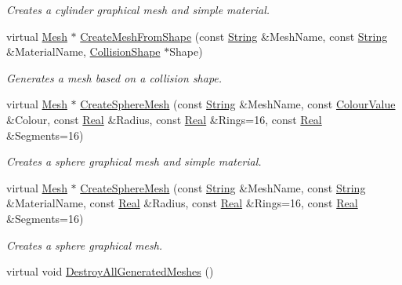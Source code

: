 \begin{DoxyCompactItemize}
\begin{DoxyCompactList}\small\item\em Creates a cylinder graphical mesh and simple material. \item\end{DoxyCompactList}\item 
virtual \hyperlink{classMezzanine_1_1Mesh}{Mesh} $\ast$ \hyperlink{classMezzanine_1_1MeshManager_a75424e13a23151fa96ef0626962034a0}{CreateMeshFromShape} (const \hyperlink{namespaceMezzanine_acf9fcc130e6ebf08e3d8491aebcf1c86}{String} \&MeshName, const \hyperlink{namespaceMezzanine_acf9fcc130e6ebf08e3d8491aebcf1c86}{String} \&MaterialName, \hyperlink{classMezzanine_1_1CollisionShape}{CollisionShape} $\ast$Shape)
\begin{DoxyCompactList}\small\item\em Generates a mesh based on a collision shape. \item\end{DoxyCompactList}\item 
virtual \hyperlink{classMezzanine_1_1Mesh}{Mesh} $\ast$ \hyperlink{classMezzanine_1_1MeshManager_a1373def36d801ef524372c76852984ec}{CreateSphereMesh} (const \hyperlink{namespaceMezzanine_acf9fcc130e6ebf08e3d8491aebcf1c86}{String} \&MeshName, const \hyperlink{classMezzanine_1_1ColourValue}{ColourValue} \&Colour, const \hyperlink{namespaceMezzanine_a726731b1a7df72bf3583e4a97282c6f6}{Real} \&Radius, const \hyperlink{namespaceMezzanine_a726731b1a7df72bf3583e4a97282c6f6}{Real} \&Rings=16, const \hyperlink{namespaceMezzanine_a726731b1a7df72bf3583e4a97282c6f6}{Real} \&Segments=16)
\begin{DoxyCompactList}\small\item\em Creates a sphere graphical mesh and simple material. \item\end{DoxyCompactList}\item 
virtual \hyperlink{classMezzanine_1_1Mesh}{Mesh} $\ast$ \hyperlink{classMezzanine_1_1MeshManager_a237f66b9471261d6a0ef6d565740ea15}{CreateSphereMesh} (const \hyperlink{namespaceMezzanine_acf9fcc130e6ebf08e3d8491aebcf1c86}{String} \&MeshName, const \hyperlink{namespaceMezzanine_acf9fcc130e6ebf08e3d8491aebcf1c86}{String} \&MaterialName, const \hyperlink{namespaceMezzanine_a726731b1a7df72bf3583e4a97282c6f6}{Real} \&Radius, const \hyperlink{namespaceMezzanine_a726731b1a7df72bf3583e4a97282c6f6}{Real} \&Rings=16, const \hyperlink{namespaceMezzanine_a726731b1a7df72bf3583e4a97282c6f6}{Real} \&Segments=16)
\begin{DoxyCompactList}\small\item\em Creates a sphere graphical mesh. \item\end{DoxyCompactList}\item 
\hypertarget{classMezzanine_1_1MeshManager_ad6ef502c838312f778c5ca77c706f20d}{
virtual void \hyperlink{classMezzanine_1_1MeshManager_ad6ef502c838312f778c5ca77c706f20d}{DestroyAllGeneratedMeshes} ()}
\label{classMezzanine_1_1MeshManager_ad6ef502c838312f778c5ca77c706f20d}


\end{DoxyCompactItemize}
